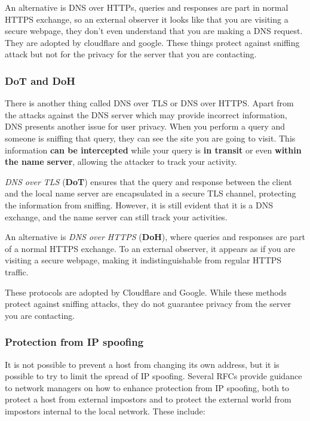 An alternative is DNS over HTTPs, queries and responses are part in normal HTTPS exchange, so an external observer it looks like that you are visiting a secure webpage, they don't even understand that you are making a DNS request. They are adopted by cloudflare and google. These things protect against sniffing attack but not for the privacy for the server that you are contacting.

\subsubsection{DoT and DoH}
There is another thing called DNS over TLS or DNS over HTTPS. Apart from the attacks against the DNS server which may provide incorrect information, DNS presents another issue for user privacy. When you perform a query and someone is sniffing that query, they can see the site you are going to visit. This information \textbf{can be intercepted} while your query is \textbf{in transit} or even \textbf{within the name server}, allowing the attacker to track your activity.

\textit{DNS over TLS} (\textbf{DoT}) ensures that the query and response between the client and the local name server are encapsulated in a secure TLS channel, protecting the information from sniffing. However, it is still evident that it is a DNS exchange, and the name server can still track your activities.

An alternative is \textit{DNS over HTTPS} (\textbf{DoH}), where queries and responses are part of a normal HTTPS exchange. To an external observer, it appears as if you are visiting a secure webpage, making it indistinguishable from regular HTTPS traffic. 

These protocols are adopted by Cloudflare and Google. While these methods protect against sniffing attacks, they do not guarantee privacy from the server you are contacting.



\subsubsection{Protection from IP spoofing}

It is not possible to prevent a host from changing its own address, but it is possible to try to limit the spread of IP spoofing. Several RFCs provide guidance to network managers on how to enhance protection from IP spoofing, both to protect a host from external impostors and to protect the external world from impostors internal to the local network. These include:

